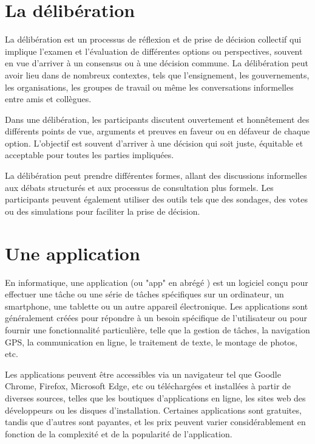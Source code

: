 \section{La délibération}\label{subsec:deliberation}

La délibération est un processus de réflexion et de prise de décision collectif qui implique l'examen et l'évaluation de différentes options ou perspectives, souvent en vue d'arriver à un consensus ou à une décision commune. La délibération peut avoir lieu dans de nombreux contextes, tels que l'ensignement, les gouvernements, les organisations, les groupes de travail ou même les conversations informelles entre amis et collègues.

Dans une délibération, les participants discutent ouvertement et honnêtement des différents points de vue, arguments et preuves en faveur ou en défaveur de chaque option. L'objectif est souvent d'arriver à une décision qui soit juste, équitable et acceptable pour toutes les parties impliquées.

La délibération peut prendre différentes formes, allant des discussions informelles aux débats structurés et aux processus de consultation plus formels. Les participants peuvent également utiliser des outils tels que des sondages, des votes ou des simulations pour faciliter la prise de décision.


\section{Une application}\label{subsec:applications}
En informatique, une application (ou "app" en abrégé ) est un logiciel conçu pour effectuer une tâche ou une série de tâches spécifiques sur un ordinateur, un smartphone, une tablette ou un autre appareil électronique. Les applications sont généralement créées pour répondre à un besoin spécifique de l'utilisateur ou pour fournir une fonctionnalité particulière, telle que la gestion de tâches, la navigation GPS, la communication en ligne, le traitement de texte, le montage de photos, etc.

Les applications peuvent être accessibles via un navigateur tel que Goodle Chrome, Firefox, Microsoft Edge, etc ou téléchargées et installées à partir de diverses sources, telles que les boutiques d'applications en ligne, les sites web des développeurs ou les disques d'installation. Certaines applications sont gratuites, tandis que d'autres sont payantes, et les prix peuvent varier considérablement en fonction de la complexité et de la popularité de l'application.

